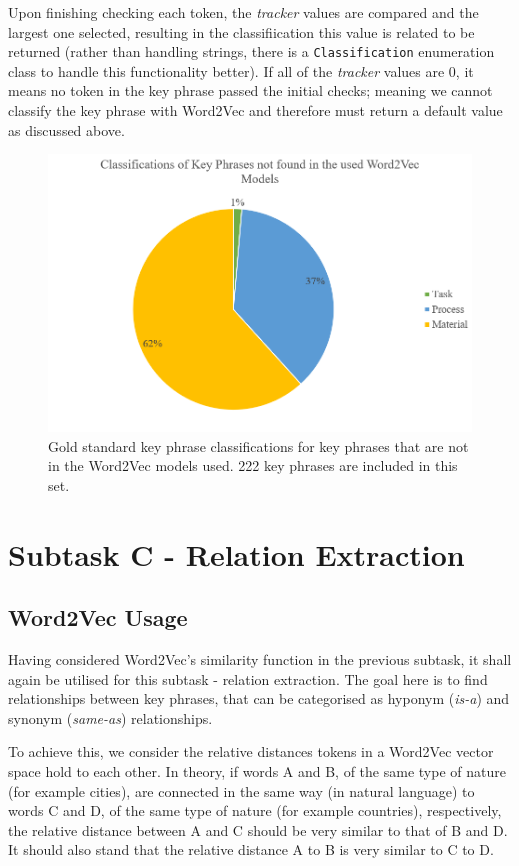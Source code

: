 Upon finishing checking each token, the \textit{tracker} values are compared and the largest one selected, resulting in the classifiication this value is related to be returned (rather than handling strings, there is a \texttt{Classification} enumeration class to handle this functionality better). If all of the \textit{tracker} values are 0, it means no token in the key phrase passed the initial checks; meaning we cannot classify the key phrase with Word2Vec and therefore must return a default value as discussed above.

\begin{figure}
	\includegraphics[width=\textwidth]{img/w2vbadtokensclasses.png}
	\caption[Key Phrase Classifications not in Word2Vec Model]{Gold standard key phrase classifications for key phrases that are not in the Word2Vec models used. 222 key phrases are included in this set.}
	\label{figure:w2vbadtokensclasses}
\end{figure}

\section{Subtask C - Relation Extraction}
\subsection{Word2Vec Usage}
Having considered Word2Vec's similarity function in the previous subtask, it shall again be utilised for this subtask - relation extraction. The goal here is to find relationships between key phrases, that can be categorised as hyponym (\textit{is-a}) and synonym (\textit{same-as}) relationships. 

To achieve this, we consider the relative distances tokens in a Word2Vec vector space hold to each other. In theory, if words A and B, of the same type of nature (for example cities), are connected in the same way (in natural language) to words C and D, of the same type of nature (for example countries), respectively, the relative distance between A and C should be very similar to that of B and D. It should also stand that the relative distance A to B is very similar to C to D. 

